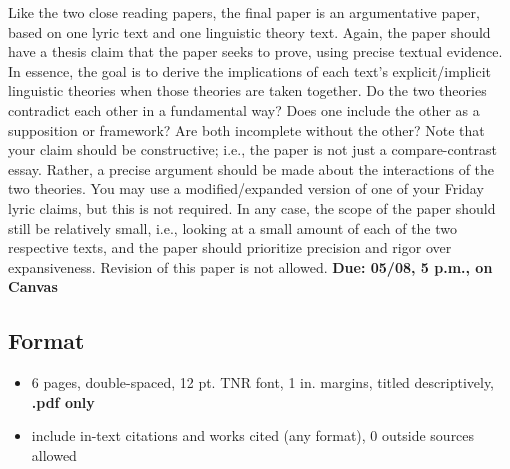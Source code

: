 \documentclass[12pt]{article}
\begin{document}
Like the two close reading papers, the final paper is an argumentative paper, based on one lyric text and one linguistic theory text. Again, the paper should have a thesis claim that the paper seeks to prove, using precise textual evidence. In essence, the goal is to derive the implications of each text's explicit/implicit linguistic theories when those theories are taken together. Do the two theories contradict each other in a fundamental way? Does one include the other as a supposition or framework? Are both incomplete without the other? Note that your claim should be constructive; i.e., the paper is not just a compare-contrast essay. Rather, a precise argument should be made about the interactions of the two theories. You may use a modified/expanded version of one of your Friday lyric claims, but this is not required. In any case, the scope of the paper should still be relatively small, i.e., looking at a small amount of each of the two respective texts, and the paper should prioritize precision and rigor over expansiveness. Revision of this paper is not allowed. \textbf{Due: 05/08, 5 p.m., on Canvas}

\subsection{Format}

\begin{itemize}
\item 6 pages, double-spaced, 12 pt. TNR font, 1 in. margins, titled descriptively, \textbf{.pdf only}
\item include in-text citations and works cited (any format), 0 outside sources allowed
\end{itemize}
\end{document}
